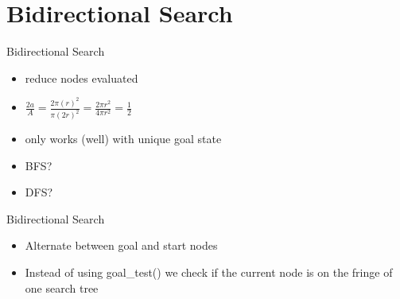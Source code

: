 \documentclass[presentation]{beamer}
\begin{document}
\section{Bidirectional Search}
\begin{frame}{Bidirectional Search}
  \begin{itemize}
  \item reduce nodes evaluated
  \item $\frac{2a}{A} =
    \frac{2\pi(r)^2}{\pi(2r)^2} =
    \frac{2\pi r^2}{4\pi r^2} = \frac{1}{2}$
  \item only works (well) with
    unique goal state
  \end{itemize}
  \begin{center}
  \begin{itemize}
  \item<1> BFS?
  \item<1> DFS? 
  \end{itemize}
\end{center}
\end{frame}

\begin{frame}{Bidirectional Search}
  \begin{itemize}
   
  \item Alternate between goal and start nodes
  \item Instead of using goal\_test() we check if the current node is
    on the fringe of one search tree
  \end{itemize}
\end{frame}
\end{document}
